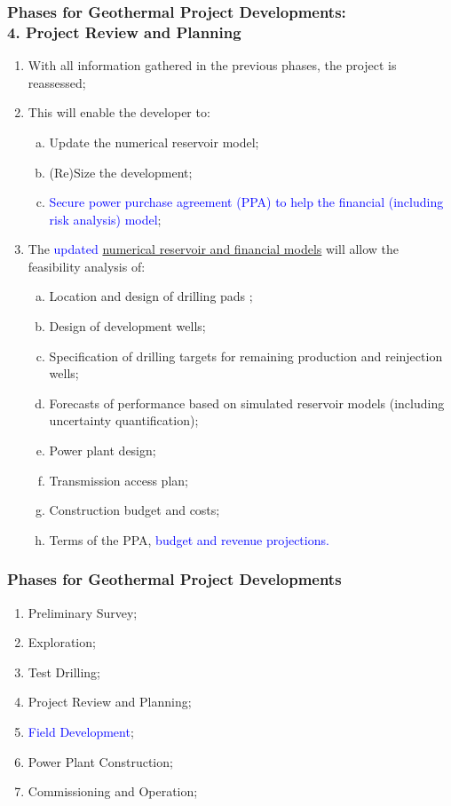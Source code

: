 \documentclass[10pt,compress]{beamer}
\newcommand{\blue}{\textcolor{blue}}
\begin{document}
\begin{frame}
 \frametitle{Phases for Geothermal Project Developments: \\ 4. Project Review and Planning}
    \begin{enumerate}[{4.}1]\scriptsize
       \item <1-> With all information gathered in the previous phases, the project is reassessed;
       \item <2-> This will enable the developer to:
          \begin{enumerate}[(a)]\scriptsize
             \item<2-> Update the numerical reservoir model;
             \item<2-> (Re)Size the development;
             \item<2-> \blue{Secure power purchase agreement (PPA) to help the financial (including risk analysis) model};
          \end{enumerate}
       \item <3-> The \blue{updated} \underline{numerical reservoir and financial models} will allow the feasibility analysis of:
          \begin{enumerate}[(a)]\scriptsize
             \item<3-> Location and design of drilling pads ;
             \item<3-> Design of development wells;
             \item<3-> Specification of drilling targets for remaining production and reinjection wells;
             \item<3-> Forecasts of performance based on simulated reservoir models (including uncertainty quantification);
             \item<3-> Power plant design;
             \item<3-> Transmission access plan;
             \item<3-> Construction budget and costs;
             \item<3-> Terms of the PPA, \blue{budget and revenue projections.}
          \end{enumerate}
    \end{enumerate}
\end{frame}
 


\begin{frame}
 \frametitle{Phases for Geothermal Project Developments} 
    \begin{enumerate}[1.]
       \item <1-> Preliminary Survey;
       \item <1-> Exploration; 
       \item <1-> Test Drilling;
       \item <1-> Project Review and Planning;
       \item <2-> \blue{Field Development}; 
       \item <1-> Power Plant Construction;
       \item <1-> Commissioning and Operation;
    \end{enumerate}
\end{frame}
\end{document}
